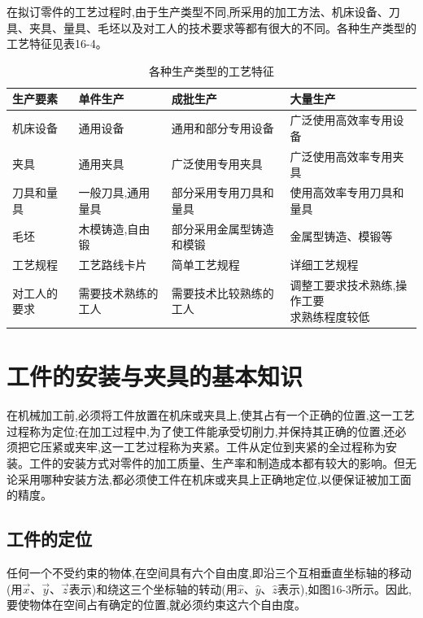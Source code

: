 \documentclass[UTF8]{ctexbook}
\newcommand{\◎}{\ensuremath{\bigcirc}}
\begin{document}
在拟订零件的工艺过程时,由于生产类型不同,所采用的加工方法、机床设备、刀具、夹具、量具、毛坯以及对工人的技术要求等都有很大的不同。各种生产类型的工艺特征见表16-4。

\begin{table}[H]
    \centering
    \caption{各种生产类型的工艺特征}
    \begin{tabular}{|l|l|l|l|}
    \hline
    生产要素 & 单件生产 & 成批生产 & 大量生产 \\
    \hline
    机床设备 & 通用设备 & 通用和部分专用设备 & 广泛使用高效率专用设备 \\
    \hline
    夹具 & 通用夹具 & 广泛使用专用夹具 & 广泛使用高效率专用夹具 \\
    \hline
    刀具和量具 & 一般刀具,通用量具 & 部分采用专用刀具和量具 & 使用高效率专用刀具和量具 \\
    \hline
    毛坯 & 木模铸造,自由锻 & 部分采用金属型铸造和模锻 & 金属型铸造、模锻等 \\
    \hline
    工艺规程 & 工艺路线卡片 & 简单工艺规程 & 详细工艺规程 \\
    \hline
    对工人的要求 & 需要技术熟练的工人 & 需要技术比较熟练的工人 & \makecell{调整工要求技术熟练,操作工要 \\ 求熟练程度较低} \\
    \hline
    \end{tabular}\end{table}

\section{工件的安装与夹具的基本知识}

在机械加工前,必须将工件放置在机床或夹具上,使其占有一个正确的位置,这一工艺过程称为定位;在加工过程中,为了使工件能承受切削力,并保持其正确的位置,还必须把它压紧或夹牢,这一工艺过程称为夹紧。工件从定位到夹紧的全过程称为安装。工件的安装方式对零件的加工质量、生产率和制造成本都有较大的影响。但无论采用哪种安装方法,都必须使工件在机床或夹具上正确地定位,以便保证被加工面的精度。

\subsection{工件的定位}

任何一个不受约束的物体,在空间具有六个自由度,即沿三个互相垂直坐标轴的移动(用$\vec{x}$、$\vec{y}$、$\vec{z}$表示)和绕这三个坐标轴的转动(用$\widehat{x}$、$\widehat{y}$、$\widehat{z}$表示),如图16-3所示。因此,要使物体在空间占有确定的位置,就必须约束这六个自由度。
\end{document}
